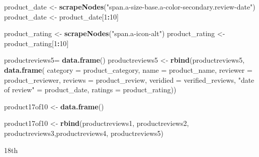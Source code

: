 \documentclass[
]{article}
\newenvironment{Shaded}{\begin{snugshade}}{\end{snugshade}}
\newcommand{\AttributeTok}[1]{\textcolor[rgb]{0.13,0.29,0.53}{#1}}
\newcommand{\DecValTok}[1]{\textcolor[rgb]{0.00,0.00,0.81}{#1}}
\newcommand{\FunctionTok}[1]{\textcolor[rgb]{0.13,0.29,0.53}{\textbf{#1}}}
\newcommand{\NormalTok}[1]{#1}
\newcommand{\OtherTok}[1]{\textcolor[rgb]{0.56,0.35,0.01}{#1}}
\newcommand{\SpecialCharTok}[1]{\textcolor[rgb]{0.81,0.36,0.00}{\textbf{#1}}}
\newcommand{\StringTok}[1]{\textcolor[rgb]{0.31,0.60,0.02}{#1}}
\begin{document}
\begin{Shaded}
\begin{Highlighting}[]
\NormalTok{  product\_date }\OtherTok{\textless{}{-}} \FunctionTok{scrapeNodes}\NormalTok{(}\StringTok{"span.a{-}size{-}base.a{-}color{-}secondary.review{-}date"}\NormalTok{)}
\NormalTok{  product\_date }\OtherTok{\textless{}{-}}\NormalTok{ product\_date[}\DecValTok{1}\SpecialCharTok{:}\DecValTok{10}\NormalTok{]}
  
\NormalTok{  product\_rating }\OtherTok{\textless{}{-}} \FunctionTok{scrapeNodes}\NormalTok{(}\StringTok{"span.a{-}icon{-}alt"}\NormalTok{)}
\NormalTok{  product\_rating }\OtherTok{\textless{}{-}}\NormalTok{ product\_rating[}\DecValTok{1}\SpecialCharTok{:}\DecValTok{10}\NormalTok{]}
  
\NormalTok{  productreviews5}\OtherTok{=} \FunctionTok{data.frame}\NormalTok{()}
\NormalTok{  productreviews5 }\OtherTok{\textless{}{-}} \FunctionTok{rbind}\NormalTok{(productreviews5, }\FunctionTok{data.frame}\NormalTok{(}
                      \AttributeTok{category =}\NormalTok{ product\_category,}
                      \AttributeTok{name =}\NormalTok{ product\_name,}
                      \AttributeTok{reviewer =}\NormalTok{ product\_reviewer,}
                      \AttributeTok{reviews =}\NormalTok{ product\_review,}
                      \AttributeTok{veridied =}\NormalTok{ verified\_reviews,}
                      \StringTok{"date of review"} \OtherTok{=}\NormalTok{ product\_date,}
                      \AttributeTok{ratings =}\NormalTok{ product\_rating))}
  
\NormalTok{  product17of10 }\OtherTok{\textless{}{-}} \FunctionTok{data.frame}\NormalTok{()}
  
\NormalTok{  product17of10 }\OtherTok{\textless{}{-}} \FunctionTok{rbind}\NormalTok{(productreviews1, productreviews2, productreviews3,productreviews4, productreviews5)}
\end{Highlighting}
\end{Shaded}

18th
\end{document}

